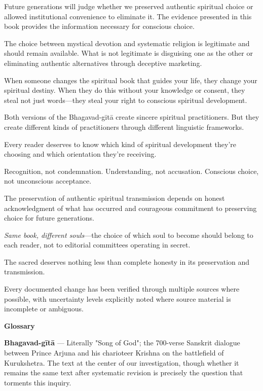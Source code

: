 \documentclass[12pt,twoside]{book}
\begin{document}
Future generations will judge whether we preserved authentic spiritual choice or allowed institutional convenience to eliminate it. The evidence presented in this book provides the information necessary for conscious choice.

The choice between mystical devotion and systematic religion is legitimate and should remain available. What is not legitimate is disguising one as the other or eliminating authentic alternatives through deceptive marketing.

When someone changes the spiritual book that guides your life, they change your spiritual destiny. When they do this without your knowledge or consent, they steal not just words—they steal your right to conscious spiritual development.

Both versions of the Bhagavad-gītā create sincere spiritual practitioners. But they create different kinds of practitioners through different linguistic frameworks.

Every reader deserves to know which kind of spiritual development they're choosing and which orientation they're receiving.

Recognition, not condemnation. Understanding, not accusation. Conscious choice, not unconscious acceptance.

The preservation of authentic spiritual transmission depends on honest acknowledgment of what has occurred and courageous commitment to preserving choice for future generations.

\textit{Same book, different souls}—the choice of which soul to become should belong to each reader, not to editorial committees operating in secret.

The sacred deserves nothing less than complete honesty in its preservation and transmission.

Every documented change has been verified through multiple sources where possible, with uncertainty levels explicitly noted where source material is incomplete or ambiguous.

\clearpage
\pagestyle{sectionopening}
\thispagestyle{sectionopening}
\markboth{}{}
\markright{}
\vspace*{0.25\textheight}
\begin{center}
{\Huge\bfseries Glossary}
\end{center}
\newpage

\textbf{\textbf{Bhagavad-gītā}} — Literally "Song of God"; the 700-verse Sanskrit dialogue between Prince Arjuna and his charioteer Krishna on the battlefield of Kurukshetra. The text at the center of our investigation, though whether it remains the same text after systematic revision is precisely the question that torments this inquiry.
\end{document}
